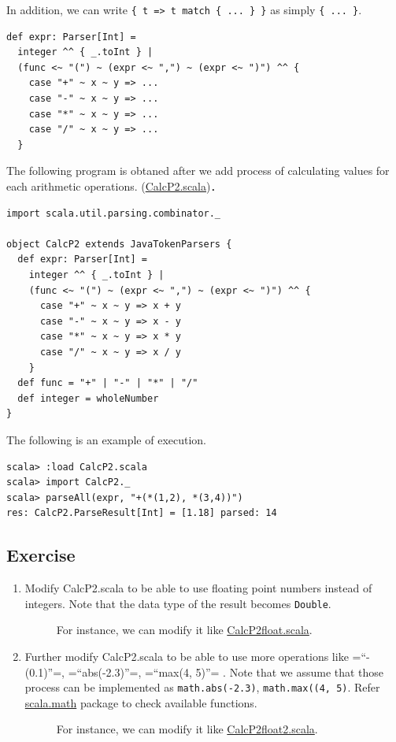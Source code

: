 \documentclass[11pt]{article}
\begin{document}
In addition, we can write \texttt{\{ t => t match \{ ... \} \}} as simply \texttt{\{ ... \}}.
\begin{verbatim}
def expr: Parser[Int] =
  integer ^^ { _.toInt } |
  (func <~ "(") ~ (expr <~ ",") ~ (expr <~ ")") ^^ {
    case "+" ~ x ~ y => ...
    case "-" ~ x ~ y => ...
    case "*" ~ x ~ y => ...
    case "/" ~ x ~ y => ...
  }
\end{verbatim}

The following program is obtaned after we add process of calculating
values for each arithmetic operations. 
(\href{prog/parser/CalcP2.scala}{CalcP2.scala})．

\begin{verbatim}
import scala.util.parsing.combinator._

object CalcP2 extends JavaTokenParsers {
  def expr: Parser[Int] =
    integer ^^ { _.toInt } |
    (func <~ "(") ~ (expr <~ ",") ~ (expr <~ ")") ^^ {
      case "+" ~ x ~ y => x + y
      case "-" ~ x ~ y => x - y
      case "*" ~ x ~ y => x * y
      case "/" ~ x ~ y => x / y
    }
  def func = "+" | "-" | "*" | "/"
  def integer = wholeNumber
}
\end{verbatim}

The following is an example of execution.
\begin{verbatim}
scala> :load CalcP2.scala
scala> import CalcP2._
scala> parseAll(expr, "+(*(1,2), *(3,4))")
res: CalcP2.ParseResult[Int] = [1.18] parsed: 14
\end{verbatim}

\subsection{Exercise}
\label{sec:orgheadline8}
\begin{enumerate}
\item Modify CalcP2.scala to be able to use floating point numbers
instead of integers. Note that the data type of the result
becomes \texttt{Double}. 
\begin{description}
\item[{}] For instance, we can modify it like \href{prog/parser/CalcP2float.scala}{CalcP2float.scala}.
\end{description}
\item Further modify CalcP2.scala to be able to use more operations
like =``-(0.1)''=, =``abs(-2.3)''=, =``max(4, 5)''= . Note that we
assume that those process can be implemented as \texttt{math.abs(-2.3)},
\texttt{math.max((4, 5)}. Refer \href{http://www.scala-lang.org/api/current/scala/math/}{scala.math} package to check available
functions. 
\begin{description}
\item[{}] For instance, we can modify it like \href{prog/parser/CalcP2float2.scala}{CalcP2float2.scala}.
\end{description}
\end{enumerate}
\end{document}
